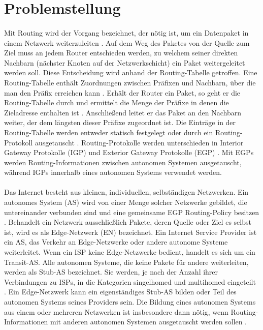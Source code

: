 \section{Problemstellung}
\paragraph{}
Mit Routing wird der Vorgang bezeichnet, der nötig ist, um ein Datenpaket in einem Netzwerk weiterzuleiten \cite{Mahorta:2002:IR}. Auf dem Weg des Paketes von der Quelle zum Ziel muss an jedem Router entschieden werden, zu welchem seiner direkten Nachbarn (nächster Knoten auf der Netzwerkschicht) ein Paket weitergeleitet werden soll. Diese Entscheidung wird anhand der Routing-Tabelle getroffen. Eine Routing-Tabelle enthält Zuordnungen zwischen Präfixen und Nachbarn, über die man den Präfix erreichen kann \cite{Mahorta:2002:IR}. Erhält der Router ein Paket, so geht er die Routing-Tabelle durch und ermittelt die Menge der Präfixe in denen die Zieladresse enthalten ist \cite{Tanenbaum:2003:CN}. Anschließend leitet er das Paket an den Nachbarn weiter, der dem längsten dieser Präfixe zugeordnet ist. Die Einträge in der Routing-Tabelle werden entweder statisch festgelegt oder durch ein Routing-Protokoll ausgetauscht \cite{Mahorta:2002:IR}. Routing-Protokolle werden unterschieden in Interior Gateway Protokolle (IGP) und Exterior Gateway Protokolle (EGP) \cite{Tanenbaum:2003:CN}. Mit EGPs werden Routing-Informationen zwischen autonomen Systemen ausgetauscht, während IGPs innerhalb eines autonomen Systems  verwendet werden.  %

\paragraph{}
Das Internet besteht aus kleinen, individuellen, selbständigen Netzwerken. Ein autonomes System (AS) wird von einer Menge solcher Netzwerke gebildet, die untereinander verbunden sind und eine gemeinsame EGP Routing-Policy besitzen \cite{hawkinson:1996:autnomousSystems}. Behandelt ein Netzwerk ausschließlich Pakete, deren Quelle oder Ziel es selbst ist,  wird es als Edge-Netzwerk (EN) bezeichnet. Ein Internet Service Provider ist ein AS, das Verkehr an Edge-Netzwerke oder andere autonome Systeme weiterleitet. Wenn ein ISP keine Edge-Netzwerke bedient, handelt es sich um ein Transit-AS. Alle autonomen Systeme, die keine Pakete für andere weiterleiten, werden als Stub-AS bezeichnet. Sie werden, je nach der Anzahl ihrer Verbindungen zu ISPs, in die Kategorien singelhomed und multihomed eingeteilt \cite{Mahorta:2002:IR}. Ein Edge-Netzwerk kann ein eigenständiges Stub-AS bilden oder Teil des autonomen Systems seines Providers sein. Die Bildung eines autonomen Systems aus einem oder mehreren Netzwerken ist insbesondere dann nötig, wenn Routing-Informationen mit anderen autonomen Systemen ausgetauscht werden sollen \cite{hawkinson:1996:autnomousSystems}.

